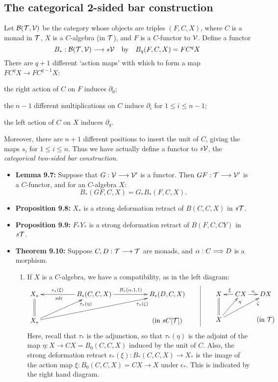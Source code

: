 \documentclass[11pt]{article}
\begin{document}
\begin{chapter7-9}
\begin{itemise}
\subsection*{The categorical 2-sided bar construction}
Let $\mathcal{B}(\mathcal{T},\mathcal{V})$ be the category whose objects are triples $(F,C,X)$, where $C$ is a monad in $\mathcal{T}$, $X$ is a $C$-algebra (in $\mathcal{T}$), and $F$ is a $C$-functor to $\mathcal{V}$. Define a functor
\[B_*:\mathcal{B}(\mathcal{T},\mathcal{V})\longrightarrow s\mathcal{V}\textup{\quad by\quad}B_q(F,C,X)=FC^qX\]
There are $q+1$ different `action maps' with which to form a map $FC^qX\to FC^{q-1}X$: 
\begin{itemise}
\item the right action of $C$ on $F$ induces $\partial_0$;
\item the $n-1$ different multiplications on $C$ induce $\partial_i$ for $1\leq i\leq n-1$;
\item the left action of $C$ on $X$ induces $\partial_q$.
\end{itemise}
Moreover, there are $n+1$ different positions to insert the unit of $C$, giving the maps $s_i$ for $1\leq i\leq n$. Thus we have actually define a functor to $s\mathcal{V}$, the \emph{categorical two-sided bar construction}.
\begin{itemize}\squishlist
\item \textbf{Lemma 9.7:} Suppose that $G:\mathcal{V}\longrightarrow\mathcal{V}'$ is a functor. Then $GF:\mathcal{T}\longrightarrow\mathcal{V}'$ is a $C$-functor, and for an $C$-algebra $X$:
\[B_*(GF,C,X)=G_*B_*(F,C,X).\]
\item \textbf{Proposition 9.8:} $X_*$ is a strong deformation retract of $B(C,C,X)$ in $s\mathcal{T}$.
\item \textbf{Proposition 9.9:} $F_*Y_*$ is a strong deformation retract of $B(F,C,CY)$ in $s\mathcal{T}$.
\item \textbf{Theorem 9.10:} 
Suppose $C,D:\mathcal{T}\longrightarrow\mathcal{T}$ are monads, and  $\alpha:C\Longrightarrow D$ is a morphism.
\begin{enumerate}\squishlist
\item If $X$ is a $C$-algebra, we have a compatibility, as in the left diagram:
\[\xymatrix@C=1.8cm{
\ar@{=}[d]X_*&\ar[l]_{\epsilon_*(\xi)\qquad}^{\textup{sdr\qquad}}
B_*(C,C,X)\ar[r]^{B_*(\alpha,1,1)}
&B_*(D,C,X)\\
X_*\ar[ur]_(.8){\tau_*(\eta)}\ar[urr]_(.8){\tau_*(\zeta)}&
&\makebox[0cm][c]{(in $sC[\calT]$)}
}\qquad\vrule\qquad\xymatrix@C=.5cm{
X\ar@{=}[d]&\ar[l]_{\xi}CX\ar[r]^\alpha&DX\\
X\ar[ur]_(.8){\eta}\ar[urr]_(.8){\zeta}&&\makebox[0cm][c]{(in $\calT$)}
}\]
Here, recall that $\tau_*$ is the adjunction, so that $\tau_*(\eta)$ is the adjoint of the map $\eta:X\to CX=B_0(C,C,X)$ induced by the unit of $C$. Also, the strong deformation retract $\epsilon_*(\xi):B_*(C,C,X)\to X_*$ is the image of the action map $\xi:B_0(C,C,X)=CX\to X$ under $\epsilon_*$. This is indicated by the right hand diagram.

\end{enumerate}
\end{itemize}
\end{itemise}
\end{chapter7-9}
\end{document}
